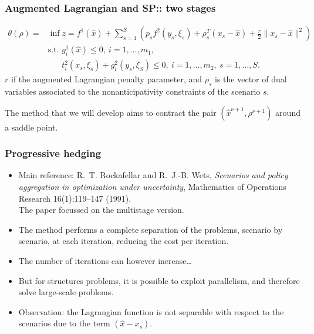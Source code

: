 \documentclass[french]{beamer}
\begin{document}
\begin{frame}
\frametitle{Augmented Lagrangian and SP:: two stages}

\vspace*{-0.5cm}

\begin{align*}
\theta(\rho) = & \inf z = f^1(\hat{x}) + \sum_{s=1}^{S} \left(
  p_sf^2(y_s,\xi_s) + \rho_s^T(x_s-\hat{x}) + \frac{r}{2} \|
x_s-\hat{x} \|^2\right) \\
& \text{s.t. } g_i^1(\hat{x}) \leq 0,\ i=1,\ldots{},m_1,\\
& \phantom{\text{s.t. }} t_i^2(x_s,\xi_s)+g_i^2(y_s,\xi_S) \leq 0,\ 
i=1,\ldots{},m_2,\ s=1,\ldots{},S.
\end{align*}
$r$ if the augmented Lagrangian penalty parameter, and $\rho_s$ is the vector of dual variables associated to the nonanticipativity constraints of the scenario  $s$.

\mbox{}

The method that we will develop aims to contract the pair $(\hat{x}^{\nu+1}, \rho^{\nu+1})$ around a saddle point.

\end{frame}

\begin{frame}
\frametitle{Progressive hedging}

\begin{itemize}
\item
Main reference:
R.~T. Rockafellar and R.~J.-B. Wets, {\sl Scenarios and policy aggregation
in optimization under uncertainty}, Mathematics of Operations
  Research 16(1):119--147 (1991).\\
  The paper focussed on the multistage version.
\item
The method performs a complete separation of the problems, scenario by scenario, at each iteration, reducing the cost per iteration.
\item
The number of iterations can however increase\ldots
\item
But for structures problems, it is possible to exploit parallelism, and therefore solve large-scale problems.
\item
{\red Observation}:
the Lagrangian function is not separable with respect to the scenarios due to the term $(\hat{x}-x_s)$.
\end{itemize}

\end{frame}
\end{document}
